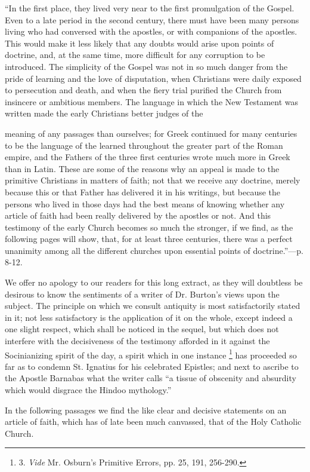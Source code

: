 ``In the
first place, they lived very near to the first promulgation of the
Gospel. Even to a late period in the second century, there must have
been many persons living who had conversed with the apostles, or with
companions of the apostles. This would make it less likely that any
doubts would arise upon points of doctrine, and, at the same time, more
difficult for any corruption to be introduced. The simplicity of the
Gospel was not in so much danger from the pride of learning and the love
of disputation, when Christians were daily exposed to persecution and
death, and when the fiery trial purified the Church from insincere or
ambitious members. The language in which the New Testament was written
made the early Christians better judges of the

meaning of any
passages than ourselves; for Greek continued for many centuries to be
the language of the learned throughout the greater part of the Roman
empire, and the Fathers of the three first centuries wrote much more in
Greek than in Latin. These are some of the reasons why an appeal is made
to the primitive Christians in matters of faith; not that we receive any
doctrine, merely because this or that Father has delivered it in his
writings, but because the persons who lived in those days had the best
means of knowing whether any article of faith had been really delivered
by the apostles or not. And this testimony of the early Church becomes
so much the stronger, if we find, as the following pages will show,
that, for at least three centuries, there was a perfect unanimity among
all the different churches upon essential points of doctrine.''—p.
8-12.

We offer no
apology to our readers for this long extract, as they will doubtless be
desirous to know the sentiments of a writer of Dr. Burton's views upon
the subject. The principle on which we consult antiquity is most
satisfactorily stated in it; not less satisfactory is the application of
it on the whole, except indeed a one slight respect, which shall be
noticed in the sequel, but which does not interfere with the
decisiveness of the testimony afforded in it against the Socinianizing
spirit of the day, a spirit which in one instance \footnote{3. \emph{Vide}
Mr. Osburn's Primitive Errors, pp. 25, 191, 256-290.} has proceeded
so far as to condemn St. Ignatius for his celebrated Epistles; and next
to ascribe to the Apostle Barnabas what the writer calls ``a tissue of
obscenity and absurdity which would disgrace the Hindoo mythology.''

In the
following passages we find the like clear and decisive statements on an
article of faith, which has of late been much canvassed, that of the
Holy Catholic Church.

